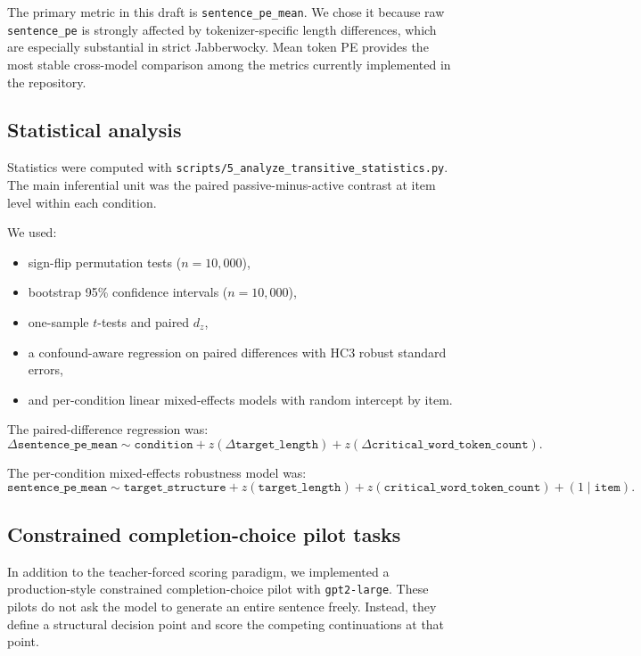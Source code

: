 \documentclass[11pt]{article}
\begin{document}
The primary metric in this draft is \texttt{sentence\_pe\_mean}. We chose it
because raw \texttt{sentence\_pe} is strongly affected by tokenizer-specific
length differences, which are especially substantial in strict Jabberwocky.
Mean token PE provides the most stable cross-model comparison among the metrics
currently implemented in the repository.

\subsection*{Statistical analysis}

Statistics were computed with
\texttt{scripts/5\_analyze\_transitive\_statistics.py}. The main inferential
unit was the paired passive-minus-active
contrast at item level within each condition.

We used:

\begin{itemize}[leftmargin=*]
    \item sign-flip permutation tests (\(n=10{,}000\)),
    \item bootstrap 95\% confidence intervals (\(n=10{,}000\)),
    \item one-sample \(t\)-tests and paired \(d_z\),
    \item a confound-aware regression on paired differences with HC3 robust
    standard errors,
    \item and per-condition linear mixed-effects models with random intercept by
    item.
\end{itemize}

The paired-difference regression was:
\[
\Delta \texttt{sentence\_pe\_mean} \sim \texttt{condition}
+ z(\Delta \texttt{target\_length})
+ z(\Delta \texttt{critical\_word\_token\_count}).
\]

The per-condition mixed-effects robustness model was:
\[
\texttt{sentence\_pe\_mean} \sim \texttt{target\_structure}
+ z(\texttt{target\_length})
+ z(\texttt{critical\_word\_token\_count})
+ (1 \mid \texttt{item}).
\]

\subsection*{Constrained completion-choice pilot tasks}

In addition to the teacher-forced scoring paradigm, we implemented a
production-style constrained completion-choice pilot with
\texttt{gpt2-large}. These pilots do not ask the model to generate an entire
sentence freely. Instead, they define a structural decision point and score the
competing continuations at that point.
\end{document}
